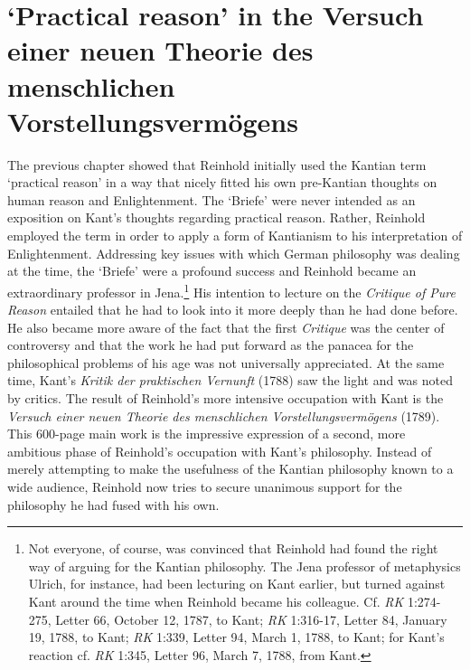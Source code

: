 
\chapter{ `Practical reason' in the Versuch einer neuen Theorie des menschlichen Vorstellungsverm\"{o}gens}




The previous chapter showed that Reinhold initially used the Kantian term `practical reason' in a way that nicely fitted his own pre{-}Kantian thoughts on human reason and Enlightenment. The `Briefe' were never intended as an exposition on Kant's thoughts regarding practical reason. Rather, Reinhold employed the term in order to apply a form of Kantianism to his interpretation of Enlightenment. Addressing key issues with which German philosophy was dealing at the time, the `Briefe' were a profound success and Reinhold became an extraordinary professor in Jena.\footnote{ Not everyone, of course, was convinced that Reinhold had found the right way of arguing for the Kantian philosophy. The Jena professor of metaphysics Ulrich, for instance, had been lecturing on Kant earlier, but turned against Kant around the time when Reinhold became his colleague. Cf. \textit{RK} 1:274{-}275, Letter 66, October 12, 1787, to Kant; \textit{RK} 1:316{-}17, Letter 84, January 19, 1788, to Kant; \textit{RK} 1:339, Letter 94, March 1, 1788, to Kant; for Kant's reaction cf. \textit{RK} 1:345, Letter 96, March 7, 1788, from Kant. } His intention to lecture on the \textit{Critique of Pure Reason} entailed that he had to look into it more deeply than he had done before. He also became more aware of the fact that the first \textit{Critique }was the center of controversy and that the work he had put forward as the panacea for the philosophical problems of his age was not universally appreciated. At the same time, Kant's \textit{Kritik der praktischen Vernunft} (1788) saw the light and was noted by critics. The result of Reinhold's more intensive occupation with Kant is the \textit{Versuch einer neuen Theorie des menschlichen Vorstellungsverm\"{o}gens }(1789). This 600{-}page main work is the impressive expression of a second, more ambitious phase of Reinhold's occupation with Kant's philosophy. Instead of merely attempting to make the usefulness of the Kantian philosophy known to a wide audience, Reinhold now tries to secure unanimous support for the philosophy he had fused with his own. 

